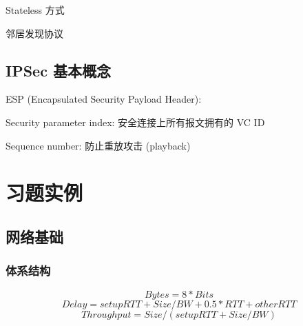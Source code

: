 \documentclass[UTF8,cs4size]{ctexart}
\begin{document}
Stateless 方式
\begin{compactitem}
  \item 邻居发现协议
\end{compactitem}
\subsection{IPSec 基本概念}
ESP (Encapsulated Security Payload Header):
\begin{compactitem}
  \item Security parameter index: 安全连接上所有报文拥有的 VC ID
  \item Sequence number: 防止重放攻击 (playback)
\end{compactitem}
\clearpage

\section{习题实例}
\subsection{网络基础}
\subsubsection{体系结构}
$$Bytes = 8 * Bits$$
$$Delay = setupRTT + Size/BW + 0.5*RTT + otherRTT$$
$$Throughput = Size / (setupRTT + Size/BW)$$
\end{document}
